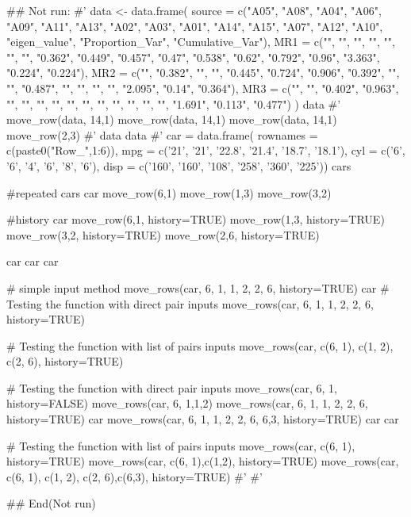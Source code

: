 \documentclass[a4paper]{book}
\begin{document}
\begin{Examples}
\begin{ExampleCode}

\#\# Not run: 
#'
data <- data.frame(
  source = c("A05", "A08", "A04", "A06",
  "A09", "A11", "A13", "A02", "A03", "A01",
  "A14", "A15", "A07", "A12", "A10",
  "eigen_value", "Proportion_Var", "Cumulative_Var"),
  MR1 = c("", "", "", "", "", "", "",
  "0.362", "0.449", "0.457", "0.47",
  "0.538", "0.62", "0.792", "0.96",
  "3.363", "0.224", "0.224"),
  MR2 = c("", "0.382", "", "", "0.445",
  "0.724", "0.906", "0.392", "", "",
  "0.487", "", "", "", "", "2.095",
   "0.14", "0.364"),
  MR3 = c("", "", "0.402", "0.963", "", "",
   "", "", "", "", "", "", "", "",
    "", "1.691", "0.113", "0.477")
)
data
#'
move_row(data, 14,1)
move_row(data, 14,1)%
move_row(data, 14,1)%
 move_row(2,3)
#'
data %
data %
#'
car = data.frame(
  rownames = c(paste0("Row_",1:6)),
  mpg = c('21', '21', '22.8', '21.4', '18.7', '18.1'),
  cyl = c('6', '6', '4', '6', '8', '6'),
  disp = c('160', '160', '108', '258', '360', '225'))
cars

#repeated
cars
car %
  move_row(6,1)%
  move_row(1,3)%
  move_row(3,2)

#history
car %
  move_row(6,1, history=TRUE)%
  move_row(1,3, history=TRUE)%
  move_row(3,2, history=TRUE)%
  move_row(2,6, history=TRUE)

car%
car%
car%

# simple input method
move_rows(car, 6, 1, 1, 2, 2, 6, history=TRUE)
car%
# Testing the function with direct pair inputs
move_rows(car, 6, 1, 1, 2, 2, 6, history=TRUE)

# Testing the function with list of pairs inputs
move_rows(car, c(6, 1), c(1, 2), c(2, 6), history=TRUE)


# Testing the function with direct pair inputs
move_rows(car, 6, 1,  history=FALSE)
move_rows(car, 6, 1,1,2)
move_rows(car, 6, 1, 1, 2, 2, 6, history=TRUE)
car%
move_rows(car, 6, 1, 1, 2, 2, 6, 6,3, history=TRUE)
car%
car%


# Testing the function with list of pairs inputs
move_rows(car, c(6, 1), history=TRUE)
move_rows(car, c(6, 1),c(1,2), history=TRUE)
move_rows(car, c(6, 1), c(1, 2), c(2, 6),c(6,3), history=TRUE)
#'
#'




## End(Not run)

\end{ExampleCode}
\end{Examples}
\end{document}
